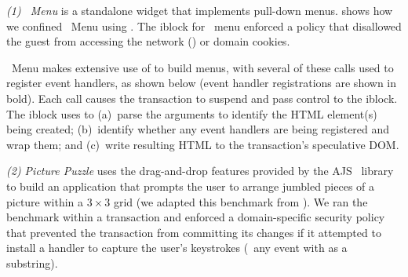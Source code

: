 \noindent
\textit{(1) \js\ Menu} is a standalone widget that implements pull-down
menus.  shows how we confined \js\ Menu using \txjs.
The iblock for \js\ menu enforced a  policy that disallowed the guest
from accessing the network () or domain cookies.

\js\ Menu makes extensive use of  to build menus,
with several of these calls used to register event handlers, as shown below
(event handler registrations are shown in bold). Each 
call causes the transaction to suspend and pass control to the iblock. The
iblock uses  to (a)~parse the arguments to identify the
HTML element(s) being created; (b)~identify whether any event handlers are being
registered and wrap them; and (c)~write resulting HTML to the transaction's
speculative DOM.

\noindent
\textit{(2) Picture Puzzle} uses the drag-and-drop features provided by the
AJS \js\ library~\cite{ajs} to build an application that prompts the user to
arrange jumbled pieces of a picture within a $3\times3$ grid (we adapted this
benchmark from \cite{picpuz}).  We ran the benchmark within a transaction and
enforced a domain-specific security policy that prevented the transaction from
committing its changes if it attempted to install a handler to capture the
user's keystrokes (\eg~any event with  as a substring).

